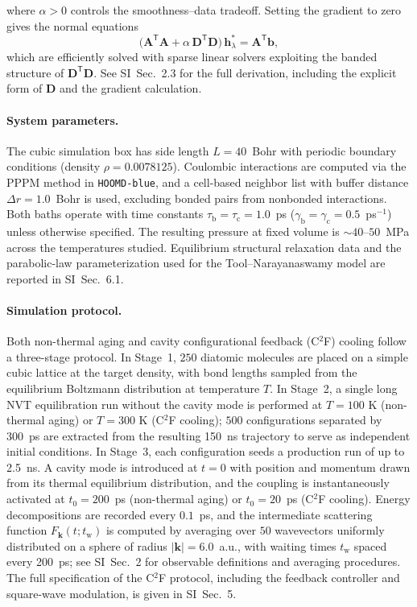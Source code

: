 \documentclass[aps, prl,
 reprint,
 superscriptaddress,
 citeautoscript,
 amsmath,amssymb,
 tightenlines
]{revtex4-2}
\begin{document}
where $\alpha > 0$ controls the smoothness--data tradeoff.
Setting the gradient to zero gives the normal equations
\begin{equation}
\bigl(\mathbf{A}^\mathsf{T}\mathbf{A}
+ \alpha\,\mathbf{D}^\mathsf{T}\mathbf{D}\bigr)\,\boldsymbol{h}_\lambda^*
= \mathbf{A}^\mathsf{T}\boldsymbol{b},
\end{equation}
which are efficiently solved with sparse linear solvers exploiting the banded structure of $\mathbf{D}^\mathsf{T}\mathbf{D}$. See SI~Sec.~2.3 for the full derivation, including the explicit form of $\mathbf{D}$ and the gradient calculation.

\paragraph*{System parameters.}
The cubic simulation box has side length $L = 40$~Bohr with periodic boundary conditions (density $\rho = 0.0078125$).
Coulombic interactions are computed via the PPPM method in \texttt{HOOMD-blue}, and a cell-based neighbor list with buffer distance $\Delta r = 1.0$~Bohr is used, excluding bonded pairs from nonbonded interactions. Both baths operate with time constants $\tau_\mathrm{b} = \tau_\mathrm{c} = 1.0$~ps ($\gamma_\mathrm{b}=\gamma_\mathrm{c}=0.5$~ps$^{-1}$) unless otherwise specified.
The resulting pressure at fixed volume is $\sim 40$--$50$~MPa across the temperatures studied.
Equilibrium structural relaxation data and the parabolic-law parameterization used for the Tool--Narayanaswamy model are reported in SI~Sec.~6.1.


\paragraph*{Simulation protocol.}
Both non-thermal aging and cavity configurational feedback (C$^2$F) cooling follow a three-stage protocol.
In Stage~1, $250$ diatomic molecules are placed on a simple cubic lattice at the target density, with bond lengths sampled from the equilibrium Boltzmann distribution at temperature $T$.
In Stage~2, a single long NVT equilibration run without the cavity mode is performed at $T = 100$ K (non-thermal aging) or $T = 300$ K (C$^2$F cooling); $500$ configurations separated by 300~ps are extracted from the resulting 150~ns trajectory to serve as independent initial conditions.
In Stage~3, each configuration seeds a production run of up to 2.5~ns. A cavity mode is introduced at $t = 0$ with position and momentum drawn from its thermal equilibrium distribution, and the coupling is instantaneously activated at $t_0 = 200$~ps (non-thermal aging) or $t_0 = 20$~ps (C$^2$F cooling).
Energy decompositions are recorded every $0.1$~ps, and the intermediate scattering function $F_{\bm{k}}(t; t_\mathrm{w})$ is computed by averaging over $50$ wavevectors uniformly distributed on a sphere of radius $|\bm k| = 6.0$~a.u., with waiting times $t_\mathrm{w}$ spaced every 200~ps; see SI~Sec.~2 for observable definitions and averaging procedures. The full specification of the C$^2$F protocol, including the feedback controller and square-wave modulation, is given in SI~Sec.~5.
\end{document}
